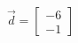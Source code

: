 \documentclass[preview]{standalone}
\begin{document}
\begin{align*}
\vec{d} =  \begin{bmatrix} -6 \\ -1 \end{bmatrix}
\end{align*}
\end{document}
